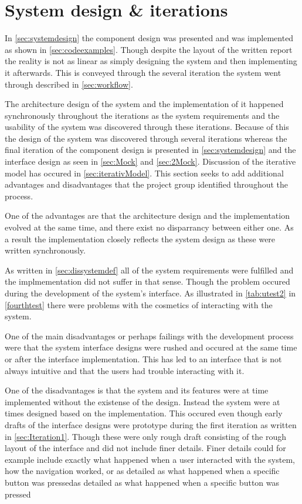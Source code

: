 \section{System design \& iterations}

In \cref{sec:systemdesign} the component design was presented and was implemented as shown in \cref{sec:codeexamples}.
Though despite the layout of the written report the reality is not as linear as simply designing the system and then implementing it afterwards.
This is conveyed through the several iteration the system went through described in \cref{sec:workflow}.

The architecture design of the system and the implementation of it happened synchronously throughout the iterations as the system requirements and the usability of the system was discovered through these iterations.
Because of this the design of the system was discovered through several iterations whereas the final iteration of the component design is presented in \cref{sec:systemdesign} and the interface design as seen in \cref{sec:Mock} and \ref{sec:2Mock}.
Discussion of the iterative model has occured in \cref{sec:iterativModel}.
This section seeks to add additional advantages and disadvantages that the project group identified throughout the process.

One of the advantages are that the architecture design and the implementation evolved at the same time, and there exist no disparrancy between either one.
As a result the implementation closely reflects the system design as these were written synchronously.

As written in \cref{sec:dissystemdef} all of the system requirements were fulfilled and the implmementation did not suffer in that sense.
Though the problem occured during the development of the system's interface.
As illustrated in \cref{tab:utest2} in \cref{fourthtest} there were problems with the cosmetics of interacting with the system. 

One of the main disadvantages or perhaps failings with the development process were that the system interface designs were rushed and occured at the same time or after the interface implementation.
This has led to an interface that is not always intuitive and that the users had trouble interacting with it.

One of the disadvantages is that the system and its features were at time implemented without the existense of the design.
Instead the system were at times designed based on the implementation.
This occured even though early drafts of the interface designs were prototype during the first iteration as written in \cref{sec:Iteration1}.
Though these were only rough draft consisting of the rough layout of the interface and did not include finer details.
Finer details could for example include exactly what happened when a user interacted with the system, how the navigation worked, or as detailed as what happened when a specific button was pressedas detailed as what happened when a specific button was pressed

